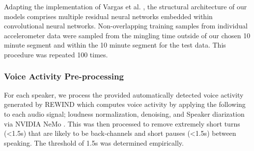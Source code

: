 \documentclass[sigconf]{acmart}
\begin{document}
 Adapting the implementation of Vargas et al. \cite{laughterquiros2023}, the structural architecture of our models comprises multiple residual neural networks embedded within convolutional neural networks. Non-overlapping training samples from individual accelerometer data were sampled from the mingling time outside of our chosen 10 minute segment and within the 10 minute segment for the test data.  This procedure was repeated 100 times. 

\subsubsection{Voice Activity Pre-processing}
\label{sec:vad}
For each speaker, we process the provided automatically detected voice activity generated by REWIND which computes voice activity by applying the following to each audio signal; loudness normalization, denoising, and Speaker diarization via NVIDIA NeMo \cite{kuchaiev2019nemo}. This was then processed to remove extremely short turns (<1.5s) that are likely to be back-channels and short pauses (<1.5s) between speaking. The threshold of 1.5s was determined empirically. 




\end{document}
